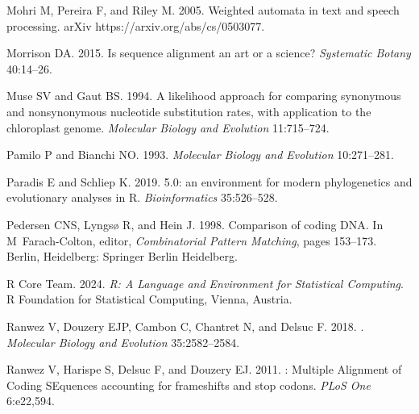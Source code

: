 \documentclass[12pt,letterpaper]{article}
\begin{document}
\begin{thebibliography}{44}
Mohri M, Pereira F, and Riley M. 2005.
\newblock Weighted automata in text and speech processing.
\newblock arXiv https://arxiv.org/abs/cs/0503077.

Morrison DA. 2015.
\newblock Is sequence alignment an art or a science?
\newblock \emph{Systematic Botany} 40:14--26.

Muse SV and Gaut BS. 1994.
\newblock A likelihood approach for comparing synonymous and nonsynonymous
  nucleotide substitution rates, with application to the chloroplast genome.
\newblock \emph{Molecular Biology and Evolution} 11:715--724.

Pamilo P and Bianchi NO. 1993.
\newblock \emph{Molecular Biology and Evolution} 10:271--281.

Paradis E and Schliep K. 2019.
 5.0: an environment for modern phylogenetics and evolutionary
  analyses in {R}.
\newblock \emph{Bioinformatics} 35:526--528.

Pedersen CNS, Lyngs{\o} R, and Hein J. 1998.
\newblock Comparison of coding {DNA}.
\newblock In M~Farach-Colton, editor, \emph{Combinatorial Pattern Matching},
  pages 153--173. Berlin, Heidelberg: Springer Berlin Heidelberg.

{R Core Team}. 2024.
\newblock \emph{R: A Language and Environment for Statistical Computing}.
\newblock R Foundation for Statistical Computing, Vienna, Austria.

Ranwez V, Douzery EJP, Cambon C, Chantret N, and Delsuc F. 2018.
.
\newblock \emph{Molecular Biology and Evolution} 35:2582--2584.

Ranwez V, Harispe S, Delsuc F, and Douzery EJ. 2011.
: {M}ultiple {A}lignment of {C}oding {SE}quences accounting
  for frameshifts and stop codons.
\newblock \emph{{PLoS} One} 6:e22,594.


\end{thebibliography}
\end{document}
